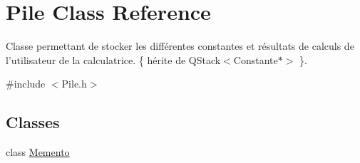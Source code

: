 \hypertarget{classPile}{\section{\-Pile \-Class \-Reference}
\label{classPile}
}


\-Classe permettant de stocker les différentes constantes et résultats de calculs de l'utilisateur de la calculatrice. \{ hérite de \-Q\-Stack$<$\-Constante$\ast$$>$ \}.  




{\ttfamily \#include $<$\-Pile.\-h$>$}

\subsection*{\-Classes}
\begin{DoxyCompactItemize}
\item 
class \hyperlink{classPile_1_1Memento}{\-Memento}
\end{DoxyCompactItemize}
